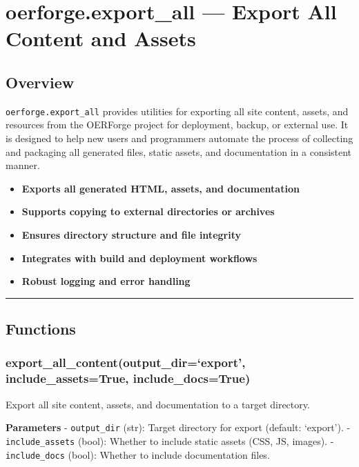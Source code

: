 \section{oerforge.export\_all --- Export All Content and
Assets}\label{oerforge.export_all-export-all-content-and-assets}

\subsection{Overview}\label{overview}

\texttt{oerforge.export\_all} provides utilities for exporting all site
content, assets, and resources from the OERForge project for deployment,
backup, or external use. It is designed to help new users and
programmers automate the process of collecting and packaging all
generated files, static assets, and documentation in a consistent
manner.

\begin{itemize}
\tightlist
\item
  \textbf{Exports all generated HTML, assets, and documentation}
\item
  \textbf{Supports copying to external directories or archives}
\item
  \textbf{Ensures directory structure and file integrity}
\item
  \textbf{Integrates with build and deployment workflows}
\item
  \textbf{Robust logging and error handling}
\end{itemize}

\begin{center}\rule{0.5\linewidth}{0.5pt}\end{center}

\subsection{Functions}\label{functions}

\subsubsection{export\_all\_content(output\_dir=`export',
include\_assets=True,
include\_docs=True)}\label{export_all_contentoutput_direxport-include_assetstrue-include_docstrue}

Export all site content, assets, and documentation to a target
directory.

\textbf{Parameters} - \texttt{output\_dir} (str): Target directory for
export (default: `export'). - \texttt{include\_assets} (bool): Whether
to include static assets (CSS, JS, images). - \texttt{include\_docs}
(bool): Whether to include documentation files.

